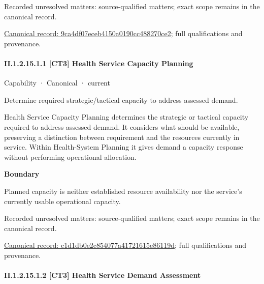{\small Recorded unresolved matters: source-qualified matters; exact scope remains in the canonical record.}\par
{\footnotesize \href{../../../../continuum/strategy/capability/9ca4df07eceb4150a0190cc488270ce2.md}{Canonical record: 9ca4df07eceb4150a0190cc488270ce2}; full qualifications and provenance.}\par
\paragraph*{II.1.2.15.1.1 [CT3] Health Service Capacity Planning}
\label{navigation:II.1.2.15.1.1}

\label{element:c1d1db0e2c854077a41721615e86119d}
{\small Capability · Canonical · current}\par

Determine required strategic/tactical capacity to address assessed demand.



Health Service Capacity Planning determines the strategic or tactical capacity required to address assessed demand. It considers what should be available, preserving a distinction between requirement and the resources currently in service. Within Health-System Planning it gives demand a capacity response without performing operational allocation.



\textbf{Boundary}



Planned capacity is neither established resource availability nor the service's currently usable operational capacity.


{\small Recorded unresolved matters: source-qualified matters; exact scope remains in the canonical record.}\par
{\footnotesize \href{../../../../continuum/strategy/capability/c1d1db0e2c854077a41721615e86119d.md}{Canonical record: c1d1db0e2c854077a41721615e86119d}; full qualifications and provenance.}\par
\paragraph*{II.1.2.15.1.2 [CT3] Health Service Demand Assessment}
\label{navigation:II.1.2.15.1.2}

